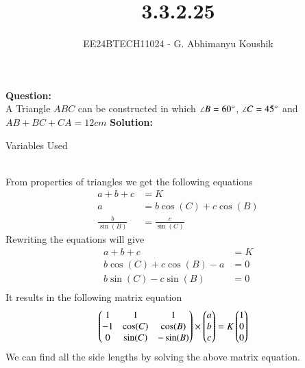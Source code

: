 \documentclass[journal]{IEEEtran}
\begin{document}

\vspace{3cm}

\title{3.3.2.25}
\author{EE24BTECH11024 - G. Abhimanyu Koushik
}
{\let\newpage\relax\maketitle}

\renewcommand{\thefigure}{\theenumi}
\renewcommand{\thetable}{\theenumi}
\setlength{\intextsep}{10pt} %

\textbf{Question:}\\
A Triangle $ABC$ can be constructed in which $\angle B=60\degree$, $\angle C=45\degree$ and $AB+BC+CA=12cm$
\textbf{Solution:}
\begin{table}[h!]    
  \centering
  
  \caption{Variables Used}
  \label{tab10.5.3.9.1}
\end{table}\\
From properties of triangles we get the following equations
\begin{align}
a+b+c&=K\\
a&=b\cos(C)+c\cos(B)\\
\frac{b}{\sin(B)}&=\frac{c}{\sin(C)}
\end{align}
Rewriting the equations will give
\begin{align}
	a+b+c&=K\\
	b\cos(C)+c\cos(B)-a&=0\\
	b\sin(C)-c\sin(B)&=0\\
\end{align}
It results in the following matrix equation
\begin{align}
  \begin{pmatrix}1 & 1 & 1\\-1 & \cos(C) & \cos(B)\\0 & \sin(C) & -\sin(B)\end{pmatrix}\times\begin{pmatrix}a\\b\\c\end{pmatrix}&=K\begin{pmatrix}1\\0\\0\end{pmatrix}
\end{align}
We can find all the side lengths by solving the above matrix equation.
\end{document}
